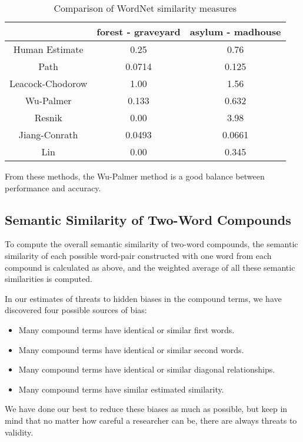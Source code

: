 \documentclass{article}
\begin{document}
\begin{table}[h!]
\centering
\begin{tabular}{|c||c|c|}
	\hline
	& forest - graveyard & asylum - madhouse \\
	\hline
	Human Estimate & 0.25 & 0.76 \\
	Path & 0.0714 & 0.125 \\
	Leacock-Chodorow & 1.00 & 1.56 \\
	Wu-Palmer & 0.133 & 0.632 \\
	Resnik & 0.00 & 3.98 \\
	Jiang-Conrath & 0.0493 & 0.0661 \\
	Lin & 0.00 & 0.345 \\
	\hline
\end{tabular}
\caption{Comparison of WordNet similarity measures} %
\label{table:wordnetsimilarity}
\end{table}

From these methods, the Wu-Palmer method is a good balance between performance and accuracy\cite{budanitsky2006evaluating,seco2004intrinsic,mihalcea2006corpus}.

\subsection{Semantic Similarity of Two-Word Compounds}

To compute the overall semantic similarity of two-word compounds, the semantic similarity of each possible word-pair constructed with one word from each compound is calculated as above, and the weighted average of all these semantic similarities is computed.

In our estimates of threats to hidden biases in the compound terms, we have discovered four possible sources of bias:
\begin{itemize}
	\item Many compound terms have identical or similar first words.
	\item Many compound terms have identical or similar second words.
	\item Many compound terms have identical or similar diagonal relationships.
	\item Many compound terms have similar estimated similarity.
\end{itemize}
We have done our best to reduce these biases as much as possible, but keep in mind that no matter how careful a researcher can be, there are always threats to validity.
\end{document}
